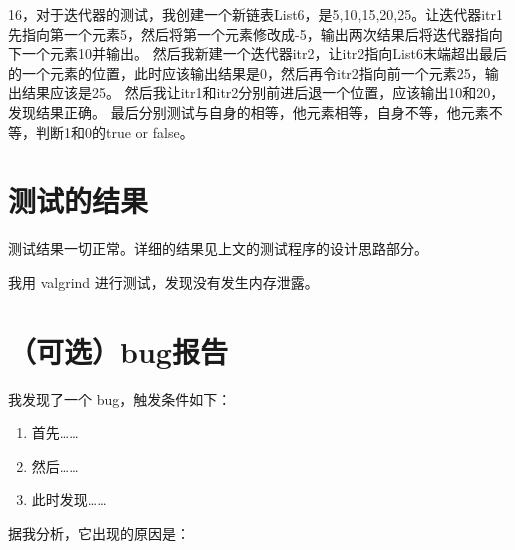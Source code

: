 \documentclass[UTF8]{ctexart}
\begin{document}
16，对于迭代器的测试，我创建一个新链表List6，是5,10,15,20,25。让迭代器itr1先指向第一个元素5，然后将第一个元素修改成-5，输出两次结果后将迭代器指向
下一个元素10并输出。
然后我新建一个迭代器itr2，让itr2指向List6末端超出最后的一个元素的位置，此时应该输出结果是0，然后再令itr2指向前一个元素25，输出结果应该是25。
然后我让itr1和itr2分别前进后退一个位置，应该输出10和20，发现结果正确。
最后分别测试与自身的相等，他元素相等，自身不等，他元素不等，判断1和0的true or false。

\section{测试的结果}

测试结果一切正常。详细的结果见上文的测试程序的设计思路部分。

我用 valgrind 进行测试，发现没有发生内存泄露。

\section{（可选）bug报告}

我发现了一个 bug，触发条件如下：

\begin{enumerate}
    \item 首先……
    \item 然后……
    \item 此时发现……
\end{enumerate}

据我分析，它出现的原因是：
\end{document}
